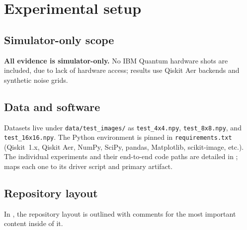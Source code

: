 \section{Experimental setup}

\subsection{Simulator-only scope}
\textbf{All evidence is simulator-only.} No IBM Quantum hardware shots are included, due to lack of hardware access; results use Qiskit Aer backends and synthetic noise grids.

\subsection{Data and software}
Datasets live under \texttt{data/test\_images/} as \texttt{test\_4x4.npy}, \texttt{test\_8x8.npy}, and \texttt{test\_16x16.npy}. The Python environment is pinned in \texttt{requirements.txt} (Qiskit~1.x, Qiskit Aer, NumPy, SciPy, pandas, Matplotlib, scikit-image, etc.). The individual experiments and their end-to-end code paths are detailed in ;  maps each one to its driver script and primary artifact.

\subsection{Repository layout}
In , the repository layout is outlined with comments for the most important content inside of it.

